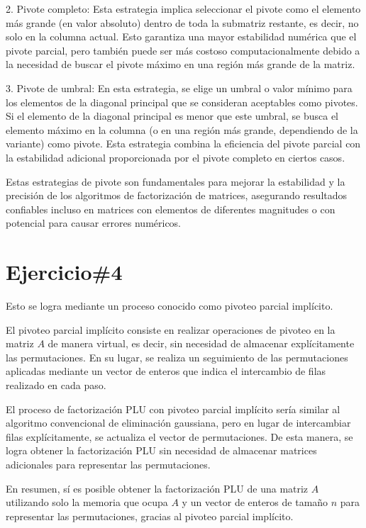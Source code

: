\documentclass[a4paper,12pt]{article}
\begin{document}
2. Pivote completo: Esta estrategia implica seleccionar el pivote como el elemento más grande (en valor absoluto) dentro de toda la submatriz restante, es decir, no solo en la columna actual. Esto garantiza una mayor estabilidad numérica que el pivote parcial, pero también puede ser más costoso computacionalmente debido a la necesidad de buscar el pivote máximo en una región más grande de la matriz.

3. Pivote de umbral: En esta estrategia, se elige un umbral o valor mínimo para los elementos de la diagonal principal que se consideran aceptables como pivotes. Si el elemento de la diagonal principal es menor que este umbral, se busca el elemento máximo en la columna (o en una región más grande, dependiendo de la variante) como pivote. Esta estrategia combina la eficiencia del pivote parcial con la estabilidad adicional proporcionada por el pivote completo en ciertos casos.

Estas estrategias de pivote son fundamentales para mejorar la estabilidad y la precisión de los algoritmos de factorización de matrices, asegurando resultados confiables incluso en matrices con elementos de diferentes magnitudes o con potencial para causar errores numéricos.

\section*{Ejercicio\#4}

Esto se logra mediante un proceso conocido como pivoteo parcial implícito.

El pivoteo parcial implícito consiste en realizar operaciones de pivoteo en la matriz \( A \) de manera virtual, es decir, sin necesidad de almacenar explícitamente las permutaciones. En su lugar, se realiza un seguimiento de las permutaciones aplicadas mediante un vector de enteros que indica el intercambio de filas realizado en cada paso.

El proceso de factorización PLU con pivoteo parcial implícito sería similar al algoritmo convencional de eliminación gaussiana, pero en lugar de intercambiar filas explícitamente, se actualiza el vector de permutaciones. De esta manera, se logra obtener la factorización PLU sin necesidad de almacenar matrices adicionales para representar las permutaciones.

En resumen, sí es posible obtener la factorización PLU de una matriz \( A \) utilizando solo la memoria que ocupa \( A \) y un vector de enteros de tamaño \( n \) para representar las permutaciones, gracias al pivoteo parcial implícito.
\end{document}
